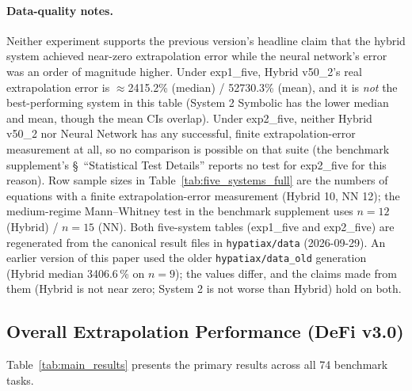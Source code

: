 \documentclass[twoside,11pt]{article}
\begin{document}
\paragraph{Data-quality notes.} Neither experiment supports the previous
version's headline claim that the hybrid system achieved near-zero
extrapolation error while the neural network's error was an order of
magnitude higher. Under exp1\_five, Hybrid v50\_2's real extrapolation
error is $\approx$2415.2\% (median) / 52730.3\% (mean), and it is
\emph{not} the best-performing system in this table (System 2 Symbolic has
the lower median and mean, though the mean CIs overlap). Under exp2\_five, neither Hybrid v50\_2 nor Neural
Network has any successful, finite extrapolation-error measurement at
all, so no comparison is possible on that suite (the benchmark
supplement's \S~``Statistical Test Details''
reports no test for exp2\_five for this reason). Row sample sizes in Table~\ref{tab:five_systems_full} are the numbers of equations
with a finite extrapolation-error measurement (Hybrid 10, NN 12); the
medium-regime Mann--Whitney test in the benchmark supplement uses $n=12$ (Hybrid) /
$n=15$ (NN). Both five-system tables (exp1\_five and exp2\_five) are regenerated
from the canonical result files in \texttt{hypatiax/data} (2026-09-29). An earlier
version of this paper used the older \texttt{hypatiax/data\_old} generation
(Hybrid median 3406.6\,\% on $n=9$); the values differ, and the claims made from them
(Hybrid is not near zero; System 2 is not worse than Hybrid) hold on both.

\subsection{Overall Extrapolation Performance (DeFi v3.0)}\label{subsec:overall-extrapolation-performance-defi-v}
\label{sec:results_defi}

Table~\ref{tab:main_results} presents the primary results across all 74 benchmark tasks.
\end{document}
